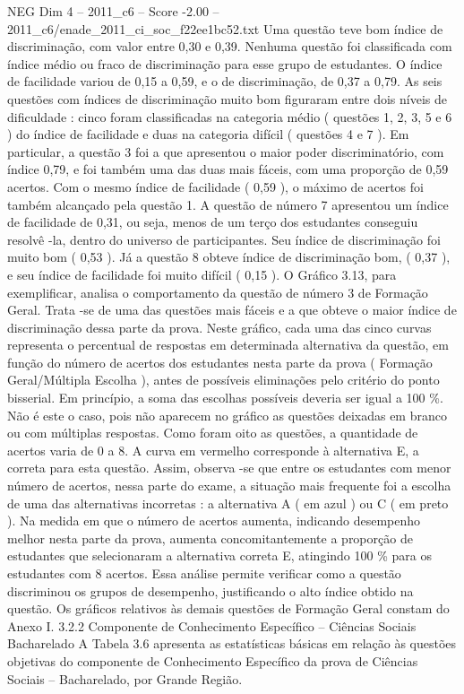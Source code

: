\begin{textsample}{NEG Dim 4 – 2011\_c6 – Score -2.00 – 2011\_c6/enade\_2011\_ci\_soc\_f22ee1bc52.txt}
Uma questão teve bom índice de discriminação, com valor entre 0,30 e 0,39.
Nenhuma questão foi classificada com índice médio ou fraco de discriminação para esse grupo de estudantes.
O índice de facilidade variou de 0,15 a 0,59, e o de discriminação, de 0,37 a 0,79.
As seis questões com índices de discriminação muito bom figuraram entre dois níveis de dificuldade : cinco foram classificadas na categoria médio ( questões 1, 2, 3, 5 e 6 ) do índice de facilidade e duas na categoria difícil ( questões 4 e 7 ).
Em particular, a questão 3 foi a que apresentou o maior poder discriminatório, com índice 0,79, e foi também uma das duas mais fáceis, com uma proporção de 0,59 acertos.
Com o mesmo índice de facilidade ( 0,59 ), o máximo de acertos foi também alcançado pela questão 1.
A questão de número 7 apresentou um índice de facilidade de 0,31, ou seja, menos de um terço dos estudantes conseguiu resolvê -la, dentro do universo de participantes.
Seu índice de discriminação foi muito bom ( 0,53 ).
Já a questão 8 obteve índice de discriminação bom, ( 0,37 ), e seu índice de facilidade foi muito difícil ( 0,15 ).
O Gráfico 3.13, para exemplificar, analisa o comportamento da questão de número 3 de Formação Geral.
Trata -se de uma das questões mais fáceis e a que obteve o maior índice de discriminação dessa parte da prova.
Neste gráfico, cada uma das cinco curvas representa o percentual de respostas em determinada alternativa da questão, em função do número de acertos dos estudantes nesta parte da prova ( Formação Geral/Múltipla Escolha ), antes de possíveis eliminações pelo critério do ponto bisserial.
Em princípio, a soma das escolhas possíveis deveria ser igual a 100 \%.
Não é este o caso, pois não aparecem no gráfico as questões deixadas em branco ou com múltiplas respostas.
Como foram oito as questões, a quantidade de acertos varia de 0 a 8.
A curva em vermelho corresponde à alternativa E, a correta para esta questão.
Assim, observa -se que entre os estudantes com menor número de acertos, nessa parte do exame, a situação mais frequente foi a escolha de uma das alternativas incorretas : a alternativa A ( em azul ) ou C ( em preto ).
Na medida em que o número de acertos aumenta, indicando desempenho melhor nesta parte da prova, aumenta concomitantemente a proporção de estudantes que selecionaram a alternativa correta E, atingindo 100 \% para os estudantes com 8 acertos.
Essa análise permite verificar como a questão discriminou os grupos de desempenho, justificando o alto índice obtido na questão.
Os gráficos relativos às demais questões de Formação Geral constam do Anexo I. 3.2.2 Componente de Conhecimento Específico – Ciências Sociais Bacharelado A Tabela 3.6 apresenta as estatísticas básicas em relação às questões objetivas do componente de Conhecimento Específico da prova de Ciências Sociais – Bacharelado, por Grande Região.

\end{textsample}
